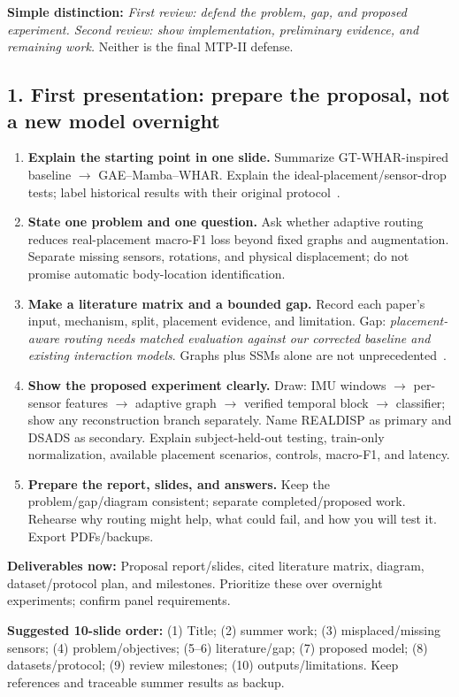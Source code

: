 \documentclass[10pt]{article}
\begin{document}
\textbf{Simple distinction:} \emph{First review: defend the problem, gap, and proposed experiment. Second review: show implementation, preliminary evidence, and remaining work.} Neither is the final MTP-II defense.

\subsection*{1. First presentation: prepare the proposal, not a new model overnight}
\begin{enumerate}[itemsep=3pt]
\item \textbf{Explain the starting point in one slide.} Summarize GT-WHAR-inspired baseline $\rightarrow$ GAE--Mamba--WHAR. Explain the ideal-placement/sensor-drop tests; label historical results with their original protocol~\cite{report}.
\item \textbf{State one problem and one question.} Ask whether adaptive routing reduces real-placement macro-F1 loss beyond fixed graphs and augmentation. Separate missing sensors, rotations, and physical displacement; do not promise automatic body-location identification.
\item \textbf{Make a literature matrix and a bounded gap.} Record each paper's input, mechanism, split, placement evidence, and limitation. Gap: \emph{placement-aware routing needs matched evaluation against our corrected baseline and existing interaction models}. Graphs plus SSMs alone are not unprecedented~\cite{decompose}.
\item \textbf{Show the proposed experiment clearly.} Draw: IMU windows $\rightarrow$ per-sensor features $\rightarrow$ adaptive graph $\rightarrow$ verified temporal block $\rightarrow$ classifier; show any reconstruction branch separately. Name REALDISP as primary and DSADS as secondary. Explain subject-held-out testing, train-only normalization, available placement scenarios, controls, macro-F1, and latency.
\item \textbf{Prepare the report, slides, and answers.} Keep the problem/gap/diagram consistent; separate completed/proposed work. Rehearse why routing might help, what could fail, and how you will test it. Export PDFs/backups.
\end{enumerate}
\textbf{Deliverables now:} Proposal report/slides, cited literature matrix, diagram, dataset/protocol plan, and milestones. Prioritize these over overnight experiments; confirm panel requirements.

\textbf{Suggested 10-slide order:} (1) Title; (2) summer work; (3) misplaced/missing sensors; (4) problem/objectives; (5--6) literature/gap; (7) proposed model; (8) datasets/protocol; (9) review milestones; (10) outputs/limitations. Keep references and traceable summer results as backup.
\end{document}

